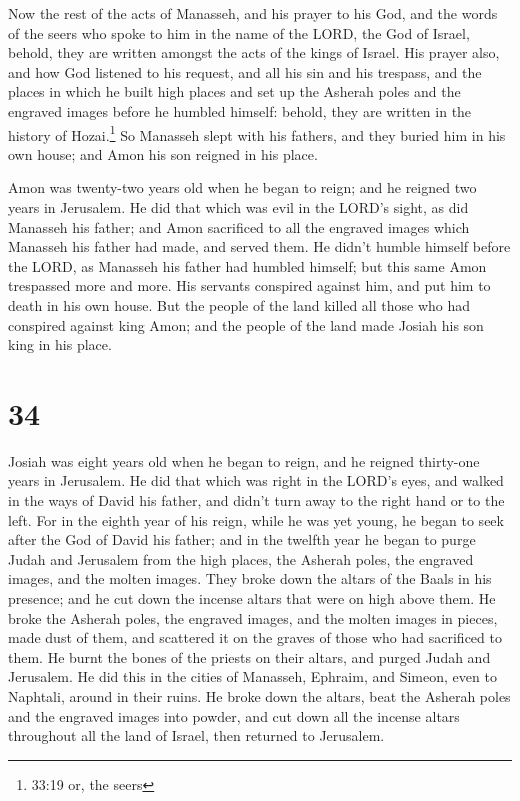  Now the rest of the acts of Manasseh, and his prayer to
his God, and the words of the seers who spoke to him in the name of the
LORD, the God of Israel, behold, they are written amongst the acts of
the kings of Israel.  His prayer also, and how God listened
to his request, and all his sin and his trespass, and the places in
which he built high places and set up the Asherah poles and the engraved
images before he humbled himself: behold, they are written in the
history of Hozai.\footnote{33:19 or, the seers}  So
Manasseh slept with his fathers, and they buried him in his own house;
and Amon his son reigned in his place.

 Amon was twenty-two years old when he began to reign; and
he reigned two years in Jerusalem.  He did that which was
evil in the LORD's sight, as did Manasseh his father; and Amon
sacrificed to all the engraved images which Manasseh his father had
made, and served them.  He didn't humble himself before the
LORD, as Manasseh his father had humbled himself; but this same Amon
trespassed more and more.  His servants conspired against
him, and put him to death in his own house.  But the people
of the land killed all those who had conspired against king Amon; and
the people of the land made Josiah his son king in his place.

\hypertarget{section-33}{%
\section{34}\label{section-33}}

 Josiah was eight years old when he began to reign, and he
reigned thirty-one years in Jerusalem.  He did that which
was right in the LORD's eyes, and walked in the ways of David his
father, and didn't turn away to the right hand or to the left.
 For in the eighth year of his reign, while he was yet
young, he began to seek after the God of David his father; and in the
twelfth year he began to purge Judah and Jerusalem from the high places,
the Asherah poles, the engraved images, and the molten images.
 They broke down the altars of the Baals in his presence;
and he cut down the incense altars that were on high above them. He
broke the Asherah poles, the engraved images, and the molten images in
pieces, made dust of them, and scattered it on the graves of those who
had sacrificed to them.  He burnt the bones of the priests
on their altars, and purged Judah and Jerusalem.  He did
this in the cities of Manasseh, Ephraim, and Simeon, even to Naphtali,
around in their ruins.  He broke down the altars, beat the
Asherah poles and the engraved images into powder, and cut down all the
incense altars throughout all the land of Israel, then returned to
Jerusalem.

